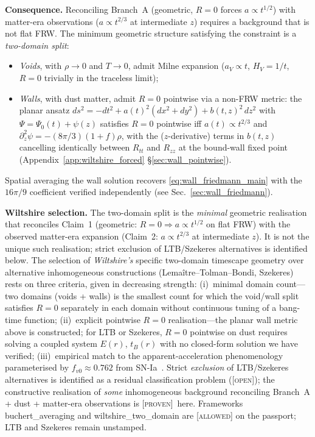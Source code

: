 \documentclass[aps,prd,twocolumn,nofootinbib,floatfix,superscriptaddress]{revtex4-2}
\newcommand{\PROVEN}{{\color{black!75!green}\textsc{[proven]}}}
\newcommand{\OPEN}{{\color{black!60!red}\textsc{[open]}}}
\begin{document}
\textbf{Consequence.} Reconciling Branch~A (geometric, $R=0$ forces
$a\propto t^{1/2}$) with matter-era observations ($a\propto t^{2/3}$
at intermediate $z$) requires a background that is not flat
FRW. The minimum geometric structure satisfying the constraint is a
\emph{two-domain split}:
\begin{itemize}
\item \emph{Voids}, with $\rho \to 0$ and $T \to 0$, admit Milne
expansion ($a_V\propto t$, $H_V = 1/t$, $R = 0$ trivially in the
traceless limit);
\item \emph{Walls}, with dust matter, admit $R = 0$ pointwise via a
non-FRW metric: the planar ansatz
$ds^2 = -dt^2 + a(t)^2(dx^2+dy^2) + b(t,z)^2\,dz^2$ with
$\Psi = \Psi_0(t) + \psi(z)$ satisfies $R = 0$ pointwise iff
$a(t)\propto t^{2/3}$ and $\partial_z^2\psi = -(8\pi/3)(1+f)\rho$, with
the ($z$-derivative) terms in $b(t,z)$ cancelling identically between
$R_{tt}$ and $R_{zz}$ at the bound-wall fixed point
(Appendix~\ref{app:wiltshire_forced} §\ref{sec:wall_pointwise}).
\end{itemize}
Spatial averaging the wall solution recovers
\eqref{eq:wall_friedmann_main} with the $16\pi/9$ coefficient
verified independently (see Sec.~\ref{sec:wall_friedmann}).

\textbf{Wiltshire selection.} The two-domain split is the
\emph{minimal} geometric realisation that reconciles
Claim~1 (geometric: $R=0 \Rightarrow a\propto t^{1/2}$ on flat FRW)
with the observed matter-era expansion (Claim~2: $a\propto t^{2/3}$
at intermediate $z$). It is not the unique such realisation;
strict exclusion of LTB/Szekeres alternatives is identified below. The selection of \emph{Wiltshire's} specific
two-domain timescape geometry over alternative inhomogeneous
constructions (Lema\^itre--Tolman--Bondi, Szekeres) rests on three
criteria, given in decreasing strength:
(i)~minimal domain count---two domains (voids + walls) is the smallest
count for which the void/wall split satisfies $R=0$ separately in
each domain without continuous tuning of a bang-time function;
(ii)~explicit pointwise $R=0$ realisation---the planar wall metric
above is constructed; for LTB or Szekeres, $R = 0$ pointwise on dust
requires solving a coupled system $E(r)$, $t_B(r)$ with no closed-form
solution we have verified;
(iii)~empirical match to the apparent-acceleration phenomenology
parameterised by $f_{v0}\approx 0.762$ from
SN-Ia~\cite{Dam2017,Wiltshire2009}.
Strict \emph{exclusion} of LTB/Szekeres alternatives is identified
as a residual classification problem (\OPEN); the constructive
realisation of \emph{some} inhomogeneous background reconciling
Branch~A + dust + matter-era observations is \PROVEN\ here.
Frameworks \textsf{buchert\_averaging} and
\textsf{wiltshire\_two\_domain} are \textsc{[allowed]} on the
passport; LTB and Szekeres remain unstamped.
\end{document}
